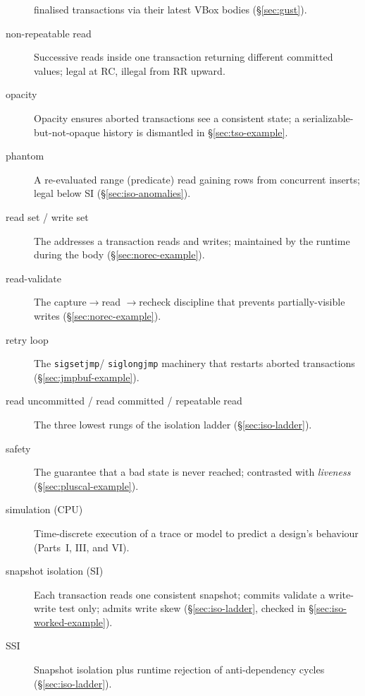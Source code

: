 \begin{description}
          finalised transactions via their latest VBox bodies
          (\S\ref{sec:gust}).
    \item[non-repeatable read]  Successive reads inside one transaction returning different committed values; legal at RC, illegal from RR upward.
    \item[opacity]  Opacity ensures aborted transactions see a
          consistent state; a serializable-but-not-opaque history is dismantled
          in \S\ref{sec:tso-example}.
    \item[phantom]  A re-evaluated range (predicate) read gaining rows from concurrent inserts; legal below SI (\S\ref{sec:iso-anomalies}).
    \item[read set / write set]   The
          addresses a transaction reads and writes; maintained by the runtime
          during the body (\S\ref{sec:norec-example}).
    \item[read-validate]  The capture$\rightarrow$read
          $\rightarrow$recheck discipline that prevents partially-visible
          writes (\S\ref{sec:norec-example}).
    \item[retry loop]  The \texttt{sigsetjmp}/
          \texttt{siglongjmp} machinery that restarts aborted transactions
          (\S\ref{sec:jmpbuf-example}).
    \item[read uncommitted / read committed / repeatable read]    The three lowest rungs of the isolation ladder (\S\ref{sec:iso-ladder}).
    \item[safety]  The guarantee that a bad state is never
          reached; contrasted with \emph{liveness} (\S\ref{sec:pluscal-example}).
    \item[simulation (CPU)]  Time-discrete execution of a
          trace or model to predict a design's behaviour (Parts~I, III, and VI).
    \item[snapshot isolation (SI)]  Each transaction reads one consistent snapshot; commits validate a write-write test only; admits write skew (\S\ref{sec:iso-ladder}, checked in \S\ref{sec:iso-worked-example}).
    \item[SSI]  Snapshot isolation plus runtime rejection of anti-dependency cycles (\S\ref{sec:iso-ladder}).

\end{description}
